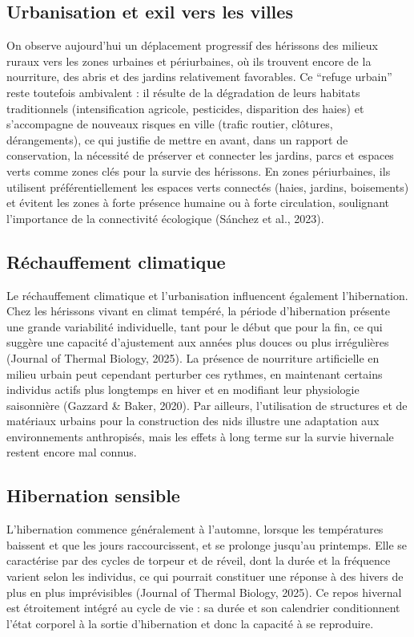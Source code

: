 \documentclass[a4paper,11pt]{article}
\begin{document}
\subsection{Urbanisation et exil vers les villes}

On observe aujourd’hui un déplacement progressif des hérissons des milieux ruraux vers les zones urbaines et périurbaines, où ils trouvent encore de la nourriture, des abris et des jardins relativement favorables. Ce \enquote{refuge urbain} reste toutefois ambivalent : il résulte de la dégradation de leurs habitats traditionnels (intensification agricole, pesticides, disparition des haies) et s’accompagne de nouveaux risques en ville (trafic routier, clôtures, dérangements), ce qui justifie de mettre en avant, dans un rapport de conservation, la nécessité de préserver et connecter les jardins, parcs et espaces verts comme zones clés pour la survie des hérissons. En zones périurbaines, ils utilisent préférentiellement les espaces verts connectés (haies, jardins, boisements) et évitent les zones à forte présence humaine ou à forte circulation, soulignant l’importance de la connectivité écologique (Sánchez et al., 2023).

\subsection{Réchauffement climatique}

Le réchauffement climatique et l’urbanisation influencent également l’hibernation. Chez les hérissons vivant en climat tempéré, la période d’hibernation présente une grande variabilité individuelle, tant pour le début que pour la fin, ce qui suggère une capacité d’ajustement aux années plus douces ou plus irrégulières (Journal of Thermal Biology, 2025). La présence de nourriture artificielle en milieu urbain peut cependant perturber ces rythmes, en maintenant certains individus actifs plus longtemps en hiver et en modifiant leur physiologie saisonnière (Gazzard \& Baker, 2020). Par ailleurs, l’utilisation de structures et de matériaux urbains pour la construction des nids illustre une adaptation aux environnements anthropisés, mais les effets à long terme sur la survie hivernale restent encore mal connus.

\subsection{Hibernation sensible}

L’hibernation commence généralement à l’automne, lorsque les températures baissent et que les jours raccourcissent, et se prolonge jusqu’au printemps. Elle se caractérise par des cycles de torpeur et de réveil, dont la durée et la fréquence varient selon les individus, ce qui pourrait constituer une réponse à des hivers de plus en plus imprévisibles (Journal of Thermal Biology, 2025). Ce repos hivernal est étroitement intégré au cycle de vie : sa durée et son calendrier conditionnent l’état corporel à la sortie d’hibernation et donc la capacité à se reproduire.
\end{document}
